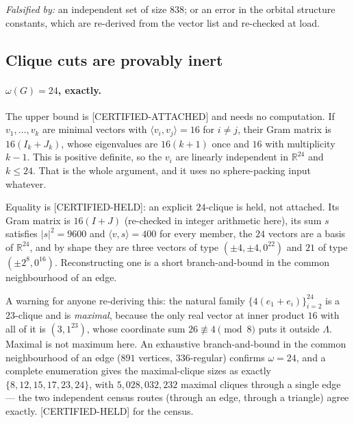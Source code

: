 \documentclass[10pt,a4paper]{article}
\newcommand{\CA}{\textsf{[CERTIFIED-ATTACHED]}}
\newcommand{\CH}{\textsf{[CERTIFIED-HELD]}}
\newcommand{\Lam}{\Lambda}
\newcommand{\ip}[2]{\langle #1,#2\rangle}
\begin{document}
\emph{Falsified by:} an independent set of size $838$; or an error in the orbital structure
constants, which are re-derived from the vector list and re-checked at load.

\subsection{Clique cuts are provably inert}\label{sec:cliques}

\paragraph{$\omega(G) = 24$, exactly.} The upper bound is \CA{} and needs no computation. If
$v_1,\dots,v_k$ are minimal vectors with $\ip{v_i}{v_j} = 16$ for $i \ne j$, their Gram matrix is
$16(I_k + J_k)$, whose eigenvalues are $16(k+1)$ once and $16$ with multiplicity $k-1$. This is
positive definite, so the $v_i$ are linearly independent in $\mathbb{R}^{24}$ and $k \le 24$. That
is the whole argument, and it uses no sphere-packing input whatever.

Equality is \CH{}: an explicit $24$-clique is held, not attached. Its Gram matrix is $16(I+J)$
(re-checked in integer arithmetic here), its sum $s$ satisfies $|s|^2 = 9600$ and $\ip{v}{s} = 400$
for every member, the $24$ vectors are a basis of $\mathbb{R}^{24}$, and by shape they are three
vectors of type $(\pm 4,\pm 4,0^{22})$ and $21$ of type $(\pm 2^8, 0^{16})$. Reconstructing one is
a short branch-and-bound in the common neighbourhood of an edge.

A warning for anyone re-deriving this: the natural family $\{4(e_1 + e_i)\}_{i=2}^{24}$ is a
$23$-clique and is \emph{maximal}, because the only real vector at inner product $16$ with all of it
is $(3,1^{23})$, whose coordinate sum $26 \not\equiv 4 \pmod 8$ puts it outside $\Lam$. Maximal is
not maximum here. An exhaustive branch-and-bound in the common neighbourhood of an edge ($891$
vertices, $336$-regular) confirms $\omega = 24$, and a complete enumeration gives the maximal-clique
sizes as exactly $\{8, 12, 15, 17, 23, 24\}$, with $5{,}028{,}032{,}232$ maximal cliques through a
single edge --- the two independent census routes (through an edge, through a triangle) agree
exactly. \CH{} for the census.
\end{document}
